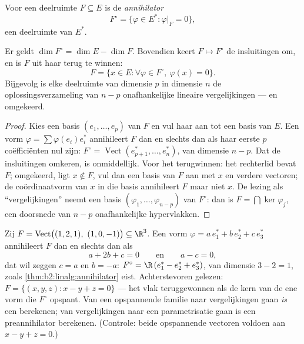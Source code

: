 \begin{definition}[Annihilator]\label{def:b2:linalg:annihilator}
Voor een deelruimte $F \subseteq E$ is de
\emph{annihilator}
\[
F^{\circ} = \{\varphi \in E^* : \varphi|_F = 0\},
\]
een deelruimte van $E^*$.
\end{definition}

\begin{theorem}\label{thm:b2:linalg:annihilator}
Er geldt $\dim F^{\circ} = \dim E - \dim F$. Bovendien keert $F
\mapsto F^\circ$ de insluitingen om, en is $F$ uit haar
 terug te winnen:
\[
F = \{x \in E : \forall\varphi \in F^\circ,\ \varphi(x) = 0\}.
\]
Bijgevolg is elke deelruimte van dimensie $p$ in dimensie $n$ de
oplossingsverzameling van $n - p$ onafhankelijke lineaire
vergelijkingen --- en omgekeerd.
\end{theorem}

\begin{proof}
Kies een basis $(e_1, \dots, e_p)$ van $F$ en vul haar aan tot een
basis van $E$. Een vorm $\varphi = \sum \varphi(e_i) e_i^*$
annihileert $F$ dan en slechts dan als haar eerste $p$
coëfficiënten nul zijn: $F^\circ = \operatorname{Vect}(e_{p+1}^*,
\dots, e_n^*)$, van dimensie $n - p$. Dat de insluitingen omkeren,
is onmiddellijk. Voor het terugwinnen: het rechterlid bevat $F$;
omgekeerd, ligt $x \notin F$, vul dan een basis van $F$ aan met $x$
en verdere vectoren; de coördinaatvorm van $x$ in die basis
annihileert $F$ maar niet $x$. De lezing als ``vergelijkingen''
neemt een basis $(\varphi_1, \dots, \varphi_{n-p})$ van $F^\circ$:
dan is $F = \bigcap \ker\varphi_j$, een doorsnede van $n - p$
onafhankelijke hypervlakken.
\end{proof}

\begin{example}\label{ex:b2:linalg:annihilatorwork}
Zij $F = \operatorname{Vect}\bigl((1, 2, 1),\ (1, 0, -1)\bigr)
\subseteq \R^3$. Een vorm $\varphi = a\,e_1^* + b\,e_2^* +
c\,e_3^*$ annihileert $F$ dan en slechts dan als
\[
a + 2b + c = 0
\qquad\text{en}\qquad
a - c = 0 ,
\]
dat wil zeggen $c = a$ en $b = -a$: $F^\circ = \R\,(e_1^* - e_2^*
+ e_3^*)$, van dimensie $3 - 2 = 1$, zoals
\cref{thm:b2:linalg:annihilator} eist. Achterstevoren gelezen: $F
= \{(x, y, z) : x - y + z = 0\}$ --- het vlak teruggewonnen als de
kern van de ene vorm die $F^\circ$ opspant. Van een opspannende
familie naar vergelijkingen gaan \emph{is} een 
berekenen; van vergelijkingen naar een parametrisatie gaan is een
preannihilator berekenen. (Controle: beide opspannende vectoren
voldoen aan $x - y + z = 0$.)
\end{example}

